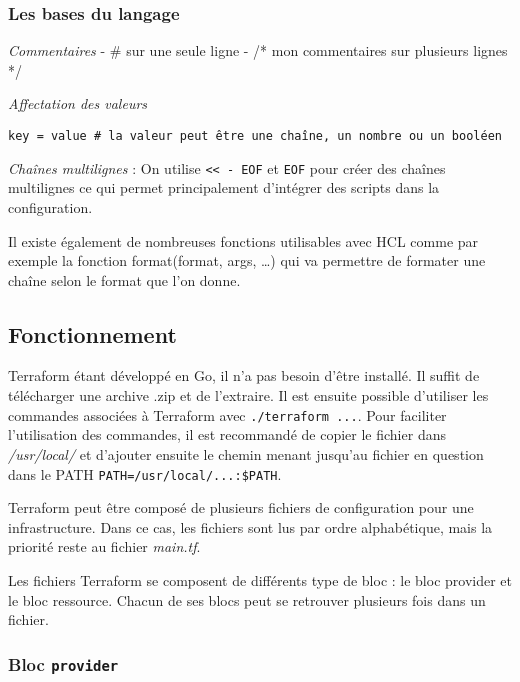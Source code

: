 \documentclass[]{article}
\begin{document}
\subsubsection{Les bases du langage}\label{les-bases-du-langage}

\emph{Commentaires} - \# sur une seule ligne - /* mon commentaires sur
plusieurs lignes */

\emph{Affectation des valeurs}

\begin{verbatim}
key = value # la valeur peut être une chaîne, un nombre ou un booléen
\end{verbatim}

\emph{Chaînes multilignes} : On utilise
\texttt{\textless{}\textless{}\ -\ EOF} et \texttt{EOF} pour créer des
chaînes multilignes ce qui permet principalement d'intégrer des scripts
dans la configuration.

Il existe également de nombreuses fonctions utilisables avec HCL comme
par exemple la fonction format(format, args, \ldots{}) qui va permettre
de formater une chaîne selon le format que l'on donne.

\subsection{Fonctionnement}\label{fonctionnement}

Terraform étant développé en Go, il n'a pas besoin d'être installé. Il
suffit de télécharger une archive .zip et de l'extraire. Il est ensuite
possible d'utiliser les commandes associées à Terraform avec
\texttt{./terraform\ ...}. Pour faciliter l'utilisation des commandes,
il est recommandé de copier le fichier dans \emph{/usr/local/} et
d'ajouter ensuite le chemin menant jusqu'au fichier en question dans le
PATH \texttt{PATH=/usr/local/...:\$PATH}.

Terraform peut être composé de plusieurs fichiers de configuration pour
une infrastructure. Dans ce cas, les fichiers sont lus par ordre
alphabétique, mais la priorité reste au fichier \emph{main.tf}.

Les fichiers Terraform se composent de différents type de bloc : le bloc
provider et le bloc ressource. Chacun de ses blocs peut se retrouver
plusieurs fois dans un fichier.

\subsubsection{\texorpdfstring{Bloc
\textbf{\texttt{provider}}}{Bloc provider}}\label{bloc-provider}
\end{document}

